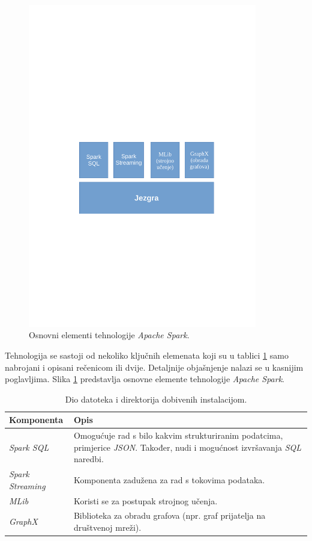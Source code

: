 \documentclass[times, utf8, zavrsni]{fer}
\begin{document}
\begin{figure}[htb]
\centering
\includegraphics[width=10cm]{img/gradivniElementi.pdf}
\caption{Osnovni elementi tehnologije \emph{Apache Spark}.}
\label{fig:spark-stack}
\end{figure}

Tehnologija se sastoji od nekoliko ključnih elemenata koji su u tablici \ref{tbl:gradivniElementi} samo nabrojani i opisani rečenicom ili dvije. Detaljnije objašnjenje nalazi se u kasnijim poglavljima. Slika \ref{fig:spark-stack} predstavlja osnovne elemente tehnologije \emph{Apache Spark}.

\begin{table}[htb]
\caption{Dio datoteka i direktorija dobivenih instalacijom.}
\label{tbl:gradivniElementi}
\centering
\begin{tabular}{l p{8cm}}
\hline
Komponenta & Opis \\
\hline
\emph{Spark SQL} & Omogućuje rad s bilo kakvim strukturiranim podatcima, primjerice \emph{JSON}. Također, nudi i mogućnost izvršavanja \emph{SQL} naredbi. \\
\emph{Spark Streaming} & Komponenta zadužena za rad s tokovima podataka. \\
\emph{MLib} & Koristi se za postupak strojnog učenja. \\
\emph{GraphX} & Biblioteka za obradu grafova (npr. graf prijatelja na društvenoj mreži).\\
\hline
\end{tabular}
\end{table}
\end{document}
